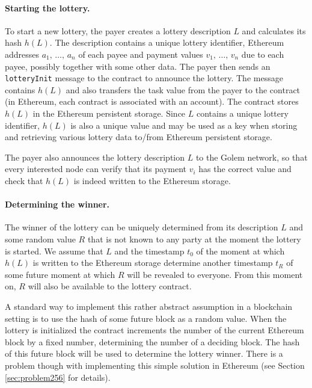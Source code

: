 \documentclass[a4paper]{article}
\begin{document}
    \paragraph{Starting the lottery.}
    To start a new lottery, the payer creates a lottery description $L$ and calculates its hash $h(L)$. The
    description contains a unique lottery identifier, Ethereum addresses $a_1,\,\ldots,\,a_n$ of each payee and
    payment values $v_1,\,\ldots,\,v_n$ due to each payee, possibly together with some other data. The payer then
    sends an \texttt{lotteryInit} message to the contract to announce the lottery. The message contains $h(L)$ and
    also transfers the task value from the payer to the contract (in Ethereum, each contract is associated with an
    account). The contract stores $h(L)$ in the Ethereum persistent storage. Since $L$ contains a unique lottery
    identifier, $h(L)$ is also a unique value and may be used as a key when storing and retrieving various lottery
    data to/from Ethereum persistent storage.

    The payer also announces the lottery description $L$ to the Golem network, so that every interested node can
    verify that its payment $v_i$ has the correct value and check that $h(L)$ is indeed written to the Ethereum
    storage.

    \paragraph{Determining the winner.}
    The winner of the lottery can be uniquely determined from its description $L$ and some random value $R$ that
    is not known to any party at the moment the lottery is started. We assume that $L$ and the timestamp $t_0$ of
    the moment at which $h(L)$ is written to the Ethereum storage determine another timestamp $t_R$ of some future
    moment at which $R$ will be revealed to everyone. From this moment on, $R$ will also be available to the lottery
    contract.

    A standard way to implement this rather abstract assumption in a blockchain setting is to use the hash of some
    future block as a random value. When the lottery is initialized the contract increments the number of the current
    Ethereum block by a fixed number, determining the number of a deciding block. The hash of this future block will
    be used to determine the lottery winner. There is a problem though with implementing this simple solution in
    Ethereum (see Section \ref{sec:problem256} for details).
\end{document}
